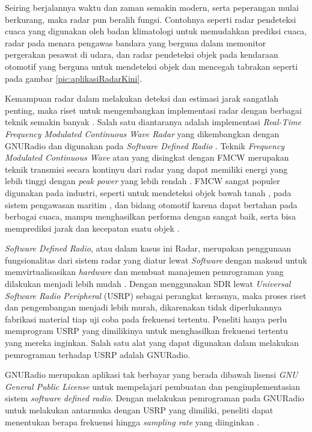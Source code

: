 Seiring berjalannya waktu dan zaman semakin modern, serta peperangan mulai berkurang, maka radar pun beralih fungsi. Contohnya seperti radar pendeteksi cuaca yang digunakan oleh badan klimatologi untuk memudahkan prediksi cuaca, radar pada menara pengawas bandara yang berguna dalam memonitor pergerakan pesawat di udara, dan radar pendeteksi objek pada kendaraan otomotif yang berguna untuk mendeteksi objek dan mencegah tabrakan seperti pada gambar \ref{pic:aplikasiRadarKini}.

Kemampuan radar dalam melakukan deteksi dan estimasi jarak sangatlah penting, maka riset untuk mengembangkan implementasi radar dengan berbagai teknik semakin banyak \cite{Jia2020,Xia2021,MoraHuaman2020,Sundaresan2015}. Salah satu diantaranya adalah implementasi \textit{Real-Time Frequency Modulated Continuous Wave Radar} yang dikembangkan dengan GNURadio dan digunakan pada \textit{Software Defined Radio} \cite{Sundaresan2015}. Teknik \textit{Frequency Modulated Continuous Wave} atau yang disingkat dengan FMCW merupakan teknik transmisi secara kontinyu dari radar yang dapat memiliki energi yang lebih tinggi dengan \textit{peak power} yang lebih rendah \cite{Stasiak2017}. FMCW sangat populer digunakan pada industri, seperti untuk mendeteksi objek bawah tanah \cite{Macasero2018}, pada sistem pengawasan maritim \cite{Lestari2017}, dan bidang otomotif  karena dapat bertahan pada berbagai cuaca, mampu menghasilkan performa dengan sangat baik, serta bisa memprediksi jarak dan kecepatan suatu objek \cite{Deng2017}. 

\textit{Software Defined Radio}, atau dalam kasus ini Radar, merupakan penggunaan fungsionalitas dari sistem radar yang diatur lewat \textit{Software} dengan maksud untuk memvirtualisasikan \textit{hardware} dan membuat manajemen pemrograman yang dilakukan menjadi lebih mudah \cite{Zeng2019}. Dengan menggunakan SDR lewat \textit{Universal Software Radio Peripheral} (USRP) sebagai perangkat kerasnya, maka proses riset dan pengembangan menjadi lebih murah, dikarenakan tidak diperlukannya fabrikasi material tiap uji coba pada frekuensi tertentu. Peneliti hanya perlu memprogram USRP yang dimilikinya untuk menghasilkan frekuensi tertentu yang mereka inginkan. Salah satu alat yang dapat digunakan dalam melakukan pemrograman terhadap USRP adalah GNURadio.


GNURadio merupakan aplikasi tak berbayar yang berada dibawah lisensi \textit{GNU General Public License} untuk mempelajari pembuatan dan pengimplementasian sistem \textit{software defined radio}. Dengan melakukan pemrograman pada GNURadio untuk melakukan antarmuka dengan USRP yang dimiliki, peneliti dapat menentukan berapa frekuensi hingga \textit{sampling rate} yang diinginkan \cite{Prabaswara2011}.

